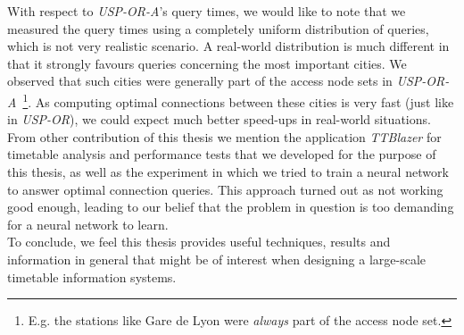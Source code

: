 With respect to \textit{USP-OR-A}'s query times, we would like to note that we measured the query times using a completely uniform distribution of queries, which is not very realistic scenario. A real-world distribution is much different in that it strongly favours queries concerning the most important cities. We observed that such cities were generally part of the access node sets in \textit{USP-OR-A}~\footnote{E.g. the stations like Gare de Lyon were \textit{always} part of the access node set.}. As computing optimal connections between these cities is very fast (just like in \textit{USP-OR}), we could expect much better speed-ups in real-world situations. \\

\noindent From other contribution of this thesis we mention the application \textit{TTBlazer} for timetable analysis and performance tests that we developed for the purpose of this thesis, as well as the experiment in which we tried to train a neural network to answer optimal connection queries. This approach turned out as not working good enough, leading to our belief that the problem in question is too demanding for a neural network to learn. \\

\noindent To conclude, we feel this thesis provides useful techniques, results and information in general that might be of interest when designing a large-scale timetable information systems.